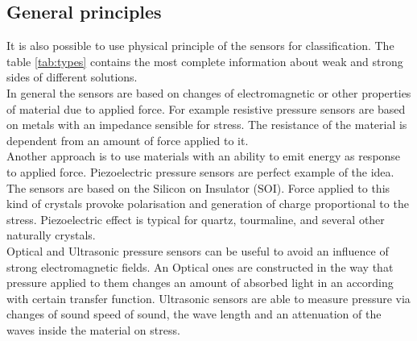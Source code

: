 \documentclass[english]{article}
\begin{document}
\subsection{General principles}

It is also possible to use physical principle of the sensors for classification. The table \ref{tab:types} contains the most complete information about weak and strong sides of different solutions.\\

In general the sensors are based on changes of electromagnetic or other properties of material due to applied force. For example resistive pressure sensors are based on metals with an impedance sensible for stress. The resistance of the material is dependent from an amount of force applied to it.\cite{types}\\

Another approach is to use materials with an ability to emit energy as response to applied force. Piezoelectric pressure sensors are perfect example of the idea. The sensors are based on the Silicon on Insulator (SOI). Force applied to this kind of crystals provoke polarisation and generation of charge proportional to the stress. Piezoelectric effect is typical for quartz, tourmaline, and several other naturally crystals.\cite{piez}\\

Optical and Ultrasonic pressure sensors can be useful to avoid an influence of strong electromagnetic fields. An Optical ones are constructed in the way that pressure applied to them changes an amount of absorbed light in an according with certain transfer function. \cite{optics} Ultrasonic sensors are able to measure pressure via changes of sound speed of sound, the wave length and an attenuation of the waves inside the material on stress.\cite{ultrasonic}
\end{document}
